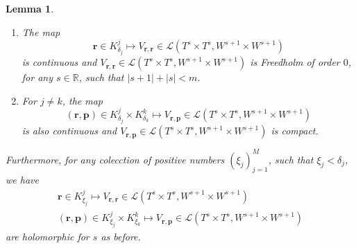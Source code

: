 \documentclass{article}
\newtheorem{lemma}[theorem]{Lemma}
\newcommand{\IR}{{\mathbb R}}
\newcommand{\bp}{{\bm p}}
\newcommand{\br}{\bm{r}}
\begin{document}
\begin{lemma}
\begin{enumerate}
\item 
The map 
$$ \br \in K^j_{\delta_j} \mapsto V_{\br,\br} \in 
\mathcal{L}(T^s\times T^s, W^{s+1}\times W^{s+1})$$
is continuous and $ V_{\br,\br} \in 
\mathcal{L}(T^s\times T^s, W^{s+1}\times W^{s+1})$ is Freedholm of order $0$, for any $s\in \IR$, such that $|s+1|+|s|<m$. 
\item 
For $j \neq k$, the map
$$ (\br,\bp) \in K^j_{\delta_j} \times K^k_{\delta_k} \mapsto V_{\br,\bp} \in 
\mathcal{L}(T^s\times T^s, W^{s+1}\times W^{s+1})$$
is also continuous and  $ V_{\br,\bp} \in 
\mathcal{L}(T^s\times T^s, W^{s+1}\times W^{s+1})$ is compact.
\end{enumerate}

Furthermore, for any colecction of positive numbers $(\xi_j)_{j=1}^M$, such that $\xi_j< \delta_j$, we have 
 \begin{align*}
\br \in K^j_{\xi_j} \mapsto V_{\br,\br} \in 
\mathcal{L}(T^s\times T^s, W^{s+1}\times W^{s+1})\\
(\br,\bp) \in K^j_{\xi_j} \times K^k_{\xi_k} \mapsto V_{\br,\bp} \in 
\mathcal{L}(T^s\times T^s, W^{s+1}\times W^{s+1})
\end{align*}
are holomorphic for $s$ as before. 
\end{lemma}
\end{document}
